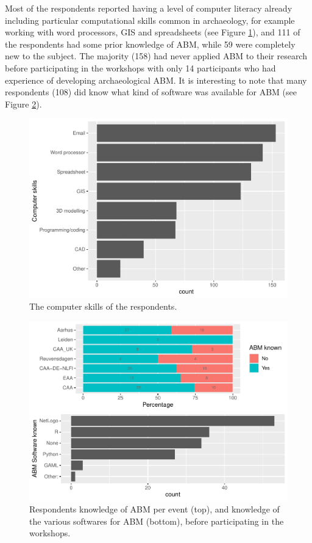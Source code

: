 \documentclass[
]{article}
\begin{document}
Most of the respondents reported having a level of computer literacy already including particular computational skills common in archaeology, for example working with word processors, GIS and spreadsheets (see Figure \ref{fig:computer-skills}), and 111 of the respondents had some prior knowledge of ABM, while 59 were completely new to the subject. The majority (158) had never applied ABM to their research before participating in the workshops with only 14 participants who had experience of developing archaeological ABM. It is interesting to note that many respondents (108) did know what kind of software was available for ABM (see Figure \ref{fig:abm-knowledge}).

\begin{figure}
\includegraphics[width=0.5\linewidth]{paper_files/figure-latex/computer-skills-1} \caption{The computer skills of the respondents.}\label{fig:computer-skills}
\end{figure}

\begin{figure}
\centering
\includegraphics{paper_files/figure-latex/abm-knowledge-1.pdf}
\caption{\label{fig:abm-knowledge}Respondents knowledge of ABM per event (top), and knowledge of the various softwares for ABM (bottom), before participating in the workshops.}
\end{figure}
\end{document}
